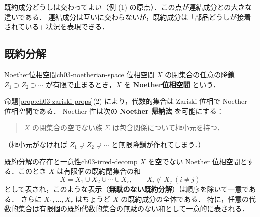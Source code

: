 既約成分どうしは交わってよい（例 (1) の原点）．この点が連結成分との大きな違いである．
連結成分は互いに交わらないが，既約成分は「部品どうしが接着されている」状況を表現できる．

\subsection{既約分解}

\begin{mydef}{Noether位相空間}{ch03-noetherian-space}
位相空間 $X$ の閉集合の任意の降鎖 $Z_1\supset Z_2\supset\cdots$ が有限で止まるとき，$X$ を \textbf{Noether位相空間} という．
\end{mydef}

命題\ref{prop:ch03-zariski-props}(2) により，代数的集合は Zariski 位相で Noether 位相空間である．
Noether 性は次の \textbf{Noether 帰納法} を可能にする：
\begin{quote}
$X$ の閉集合の空でない族 $\Sigma$ は包含関係について極小元を持つ．
\end{quote}
（極小元がなければ $Z_1\supsetneq Z_2\supsetneq\cdots$ と無限降鎖が作れてしまう．）

\begin{mythm}{既約分解の存在と一意性}{ch03-irred-decomp}
$X$ を空でない Noether 位相空間とする．このとき $X$ は有限個の既約閉集合の和
\[
  X=X_1\cup X_2\cup\cdots\cup X_r,\qquad X_i\not\subset X_j\ (i\ne j)
\]
として表され，このような表示（\textbf{無駄のない既約分解}）は順序を除いて一意である．
さらに $X_1,\dots,X_r$ はちょうど $X$ の既約成分の全体である．
特に，任意の代数的集合は有限個の既約代数的集合の無駄のない和として一意的に表される．
\end{mythm}


